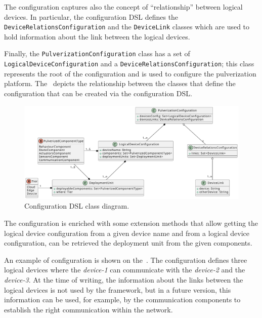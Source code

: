 The configuration captures also the concept of ``relationship'' between logical devices. In particular, the configuration DSL defines
the \texttt{Device\-Relations\-Configuration} and the \texttt{DeviceLink} classes which are used to hold information about the link between the logical devices.

Finally, the \texttt{PulverizationConfiguration} class has a set of \texttt{Logical\-Device\-Configuration} and a
\texttt{DeviceRelationsConfiguration}; this class represents the root of the configuration and is used to configure the pulverization platform.
The~ depicts the relationship between the classes that define the configuration that can be created via the
configuration DSL.

\begin{figure}
	\centering
	\includegraphics[width=\textwidth]{figures/config-dsl-class.pdf}
	\caption{Configuration DSL class diagram.}
	\label{fig:configuration-dsl-classes}
\end{figure}

The configuration is enriched with some extension methods that allow getting the logical device configuration from a given device name and
from a logical device configuration, can be retrieved the deployment unit from the given components.

An example of configuration is shown on the~. The configuration defines three logical devices where the
\emph{device-1} can communicate with the \emph{device-2} and the \emph{device-3}. At the time of writing, the information about the links
between the logical devices is not used by the framework, but in a future version, this information can be used, for example, by the communication
components to establish the right communication within the network.



